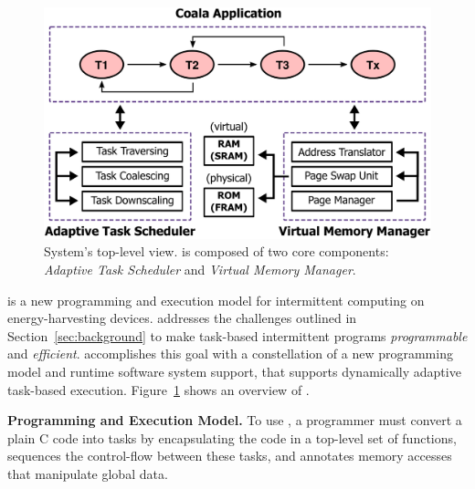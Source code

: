 \begin{figure}
	\centering
	\includegraphics[width=\columnwidth]{figures/overview.pdf}
	\caption{System's top-level view. \sys is composed of two core components: \emph{Adaptive Task Scheduler} and \emph{Virtual Memory Manager}.}
	\label{fig:system_overview}
\end{figure}

\sys is a new programming and execution model for intermittent computing on energy-harvesting devices. \sys addresses the challenges outlined in Section~\ref{sec:background} to make task-based intermittent programs {\em programmable} and {\em efficient}. \sys accomplishes this goal with a constellation of a new programming model and runtime software system support, that supports dynamically adaptive task-based execution. Figure~\ref{fig:system_overview} shows an overview of \sys.

\textbf{Programming and Execution Model.}  To use \sys, a programmer must convert a plain C code into tasks by encapsulating the code in a top-level set of functions, sequences the control-flow between these tasks, and annotates memory accesses that manipulate global data.


